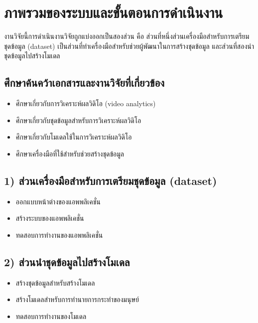 \section{ภาพรวมของระบบและขั้นตอนการดำเนินงาน}
งานวิจัยนี้การดำเนินงานวิจัยถูกแบ่งออกเป็นสองส่วน คือ ส่วนที่หนึ่งส่วนเครื่องมือสำหรับการเตรียมชุดข้อมูล (dataset) เป็นส่วนที่ทำเครื่องมือสำหรับช่วยผู้พัฒนาในการสร้างชุดข้อมูล และส่วนที่สองนำชุดข้อมูลไปสร้างโมเดล
\subsection*{ศึกษาค้นคว้าเอกสารและงานวิจัยที่เกี่ยวข้อง}
\begin{itemize}\setlength\itemsep{-0.3em}
	\item ศึกษาเกี่ยวกับการวิเคราะห์ผลวิดิโอ (video analytics)
	\item ศึกษาเกี่ยวกับชุดข้อมูลสำหรับการวิเคราะห์ผลวิดิโอ
	\item ศึกษาเกี่ยวกับโมเดลใช้ในการวิเคราะห์ผลวิดิโอ
	\item ศึกษาเครื่องมือที่ใช้สำหรับช่วยสร้างชุดข้อมูล
\end{itemize}
\subsection*{1) ส่วนเครื่องมือสำหรับการเตรียมชุดข้อมูล (dataset)}
\begin{itemize}\setlength\itemsep{-0.3em}
	\item ออกแบบหน้าต่างของแอพพลิเคชั่น
	\item สร้างระบบของแอพพลิเคชั่น
	\item ทดสอบการทำงานของแอพพลิเคชั่น
\end{itemize}
\subsection*{2) ส่วนนำชุดข้อมูลไปสร้างโมเดล}
\begin{itemize}\setlength\itemsep{-0.3em}
	\item สร้างชุดข้อมูลสำหรับสร้างโมเดล
	\item สร้างโมเดลสำหรับการทำนายการกระทำของมนุษย์
	\item ทดสอบการทำงานของโมเดล
\end{itemize}

